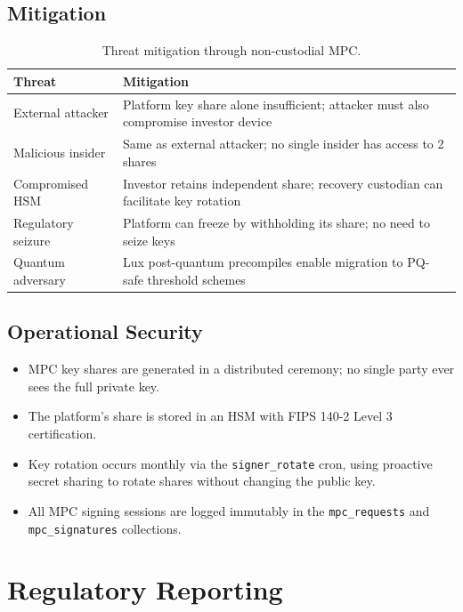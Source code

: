 \documentclass[11pt,a4paper]{article}
\begin{document}
\subsection{Mitigation}

\begin{table}[H]
\centering
\caption{Threat mitigation through non-custodial MPC.}
\label{tab:threats}
\begin{tabular}{lp{7cm}}
\toprule
\textbf{Threat} & \textbf{Mitigation} \\
\midrule
External attacker & Platform key share alone insufficient; attacker must also compromise investor device \\
Malicious insider & Same as external attacker; no single insider has access to 2 shares \\
Compromised HSM & Investor retains independent share; recovery custodian can facilitate key rotation \\
Regulatory seizure & Platform can freeze by withholding its share; no need to seize keys \\
Quantum adversary & Lux post-quantum precompiles enable migration to PQ-safe threshold schemes \cite{lux-mchain-mpc} \\
\bottomrule
\end{tabular}
\end{table}

\subsection{Operational Security}

\begin{itemize}[nosep]
  \item MPC key shares are generated in a distributed ceremony; no single party ever sees the full private key.
  \item The platform's share is stored in an HSM with FIPS 140-2 Level 3 certification.
  \item Key rotation occurs monthly via the \texttt{signer\_rotate} cron, using proactive secret sharing to rotate shares without changing the public key.
  \item All MPC signing sessions are logged immutably in the \texttt{mpc\_requests} and \texttt{mpc\_signatures} collections.
\end{itemize}

\section{Regulatory Reporting}\label{sec:reporting}
\end{document}
